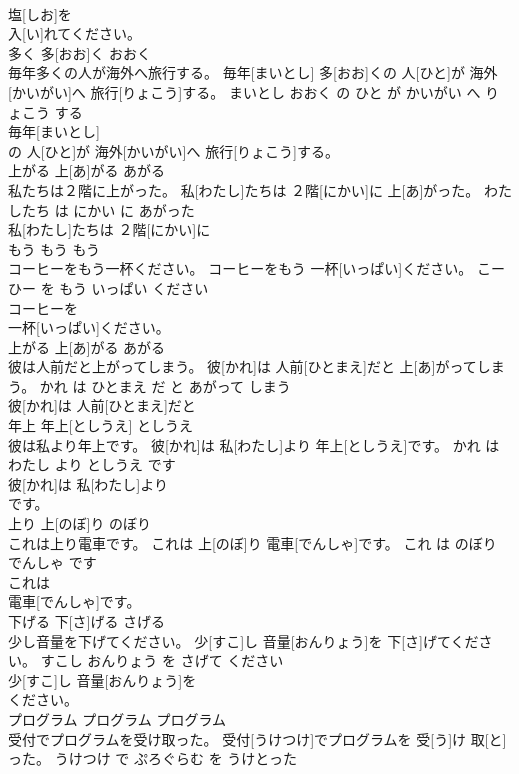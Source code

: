 \documentclass[8pt]{extreport}
\begin{document}
\begin{CJK}{UTF8}{min}
\\	塩[しお]を
\\	入[い]れてください。			
\\	多く	多[おお]く	おおく	
\\	毎年多くの人が海外へ旅行する。	毎年[まいとし] 多[おお]くの 人[ひと]が 海外[かいがい]へ 旅行[りょこう]する。	まいとし おおく の ひと が かいがい へ りょこう する	
\\	毎年[まいとし]
\\	の 人[ひと]が 海外[かいがい]へ 旅行[りょこう]する。			
\\	上がる	上[あ]がる	あがる	
\\	私たちは２階に上がった。	私[わたし]たちは ２階[にかい]に 上[あ]がった。	わたしたち は にかい に あがった	
\\	私[わたし]たちは ２階[にかい]に
\\	もう	もう	もう	
\\	コーヒーをもう一杯ください。	コーヒーをもう 一杯[いっぱい]ください。	こーひー を もう いっぱい ください	
\\	コーヒーを
\\	一杯[いっぱい]ください。			
\\	上がる	上[あ]がる	あがる	
\\	彼は人前だと上がってしまう。	彼[かれ]は 人前[ひとまえ]だと 上[あ]がってしまう。	かれ は ひとまえ だ と あがって しまう	
\\	彼[かれ]は 人前[ひとまえ]だと
\\	年上	年上[としうえ]	としうえ	
\\	彼は私より年上です。	彼[かれ]は 私[わたし]より 年上[としうえ]です。	かれ は わたし より としうえ です	
\\	彼[かれ]は 私[わたし]より
\\	です。			
\\	上り	上[のぼ]り	のぼり	
\\	これは上り電車です。	これは 上[のぼ]り 電車[でんしゃ]です。	これ は のぼり でんしゃ です	
\\	これは
\\	電車[でんしゃ]です。			
\\	下げる	下[さ]げる	さげる	
\\	少し音量を下げてください。	少[すこ]し 音量[おんりょう]を 下[さ]げてください。	すこし おんりょう を さげて ください	
\\	少[すこ]し 音量[おんりょう]を
\\	ください。			
\\	プログラム	プログラム	プログラム	
\\	受付でプログラムを受け取った。	受付[うけつけ]でプログラムを 受[う]け 取[と]った。	うけつけ で ぷろぐらむ を うけとった	

\end{CJK}
\end{document}

